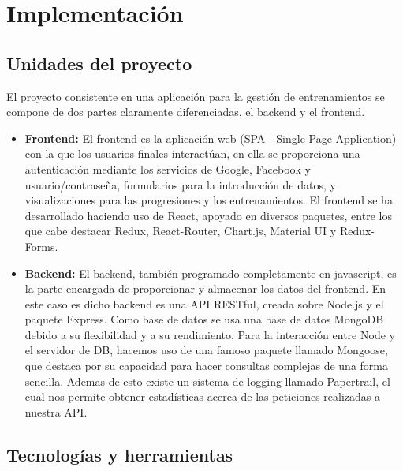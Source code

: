 \chapter{Implementación}

\section {Unidades del proyecto}
El proyecto consistente en una aplicación para la gestión de entrenamientos se compone de dos partes claramente diferenciadas, el backend y el frontend.
\begin{itemize}
  \item \textbf{Frontend:} El frontend es la aplicación web (SPA - Single Page Application) con la que los usuarios finales interactúan, en ella se proporciona una autenticación mediante los servicios de Google, Facebook y usuario/contraseña, formularios para la introducción de datos, y visualizaciones para las progresiones y los entrenamientos. El frontend se ha desarrollado haciendo uso de React, apoyado en diversos paquetes, entre los que cabe destacar Redux, React-Router, Chart.js, Material UI y Redux-Forms.
  \item \textbf{Backend:} El backend, también programado completamente en javascript, es la parte encargada de proporcionar y almacenar los datos del frontend. En este caso es dicho backend es una API RESTful, creada sobre Node.js y el paquete Express. Como base de datos se usa una base de datos MongoDB debido a su flexibilidad y a su rendimiento. Para la interacción entre Node y el servidor de DB, hacemos uso de una famoso paquete llamado Mongoose, que destaca por su capacidad para hacer consultas complejas de una forma sencilla. Ademas de esto existe un sistema de logging llamado Papertrail, el cual nos permite obtener estadísticas acerca de las peticiones realizadas a nuestra API.
\end{itemize}

\section {Tecnologías y herramientas}
